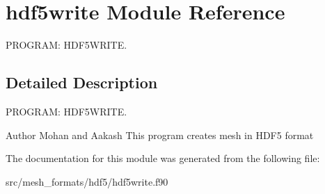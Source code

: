 \hypertarget{classhdf5write}{\section{hdf5write Module Reference}
\label{classhdf5write}
}


P\-R\-O\-G\-R\-A\-M\-: H\-D\-F5\-W\-R\-I\-T\-E.  




\subsection{Detailed Description}
P\-R\-O\-G\-R\-A\-M\-: H\-D\-F5\-W\-R\-I\-T\-E. 

\begin{DoxyAuthor}{Author}
Mohan and Aakash This program creates mesh in H\-D\-F5 format 
\end{DoxyAuthor}


The documentation for this module was generated from the following file\-:\begin{DoxyCompactItemize}
\item 
src/mesh\-\_\-formats/hdf5/hdf5write.\-f90\end{DoxyCompactItemize}
